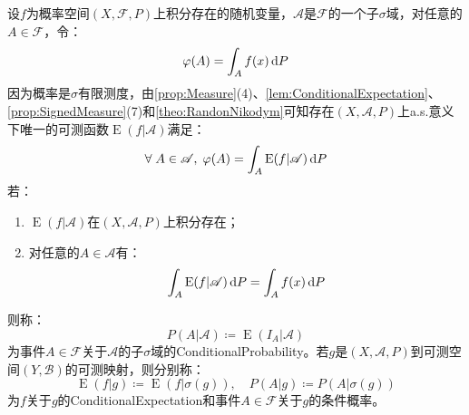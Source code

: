 \begin{definition}
	设$f$为概率空间$(X,\mathscr{F},P)$上积分存在的随机变量，$\mathscr{A}$是$\mathscr{F}$的一个子$\sigma$域，对任意的$A\in\mathscr{F}$，令：
	\begin{equation*}
		\varphi(A)=\int_{A}f(x)\mathop{}\!\mathrm{d} P
	\end{equation*}
	因为概率是$\sigma$有限测度，由\cref{prop:Measure}(4)、\cref{lem:ConditionalExpectation}、\cref{prop:SignedMeasure}(7)和\cref{theo:RandonNikodym}可知存在$(X,\mathscr{A},P)$上a.s.意义下唯一的可测函数$\operatorname{E}(f|\mathscr{A})$满足：
	\begin{equation*}
		\forall\;A\in\mathscr{A},\;\varphi(A)=\int_{A}\operatorname{E}(f|\mathscr{A})\mathop{}\!\mathrm{d} P
	\end{equation*}
	若：
	\begin{enumerate}
		\item $\operatorname{E}(f|\mathscr{A})$在$(X,\mathscr{A},P)$上积分存在；
		\item 对任意的$A\in\mathscr{A}$有：
		\begin{equation*}
			\int_{A}\operatorname{E}(f|\mathscr{A})\mathop{}\!\mathrm{d} P=\int_{A}f(x)\mathop{}\!\mathrm{d} P
		\end{equation*}
	\end{enumerate}
	则称：
	\begin{equation*}
		P(A|\mathscr{A})\coloneq\operatorname{E}(I_A|\mathscr{A})
	\end{equation*}
	为事件$A\in\mathscr{F}$关于$\mathscr{A}$的子$\sigma$域的\gls{ConditionalProbability}。若$g$是$(X,\mathscr{A},P)$到可测空间$(Y,\mathscr{B})$的可测映射，则分别称：
	\begin{equation*}
		\operatorname{E}(f|g)\coloneq\operatorname{E}(f|\sigma(g)),\quad P(A|g)\coloneq P(A|\sigma(g))
	\end{equation*}
	为$f$关于$g$的\gls{ConditionalExpectation}和事件$A\in\mathscr{F}$关于$g$的条件概率。
\end{definition}
\begin{lemma}
	
\end{lemma}
